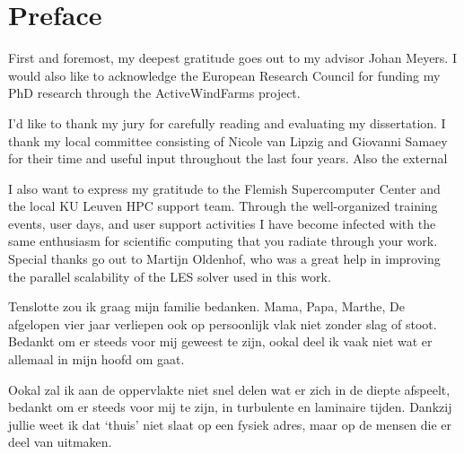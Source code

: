 \chapter*{Preface}                                  \label{ch:preface}

First and foremost, my deepest gratitude goes out to my advisor Johan Meyers. %
I would also like to acknowledge the European Research Council for funding my PhD research through the ActiveWindFarms project. 

I'd like to thank my jury for carefully reading and evaluating my dissertation. I thank my local committee consisting of Nicole van Lipzig and Giovanni Samaey for their time and useful input throughout the last four years. Also the external 









I also want to express my gratitude to the Flemish Supercomputer Center and the local KU Leuven HPC support team. Through the well-organized training events, user days, and user support activities I have become infected with the same enthusiasm for scientific computing that you radiate through your work. Special thanks go out to Martijn Oldenhof, who was a great help in improving the parallel scalability of the LES solver used in this work.





Tenslotte zou ik graag mijn familie bedanken. Mama,
Papa,
Marthe,
De afgelopen vier jaar verliepen ook op persoonlijk vlak niet zonder slag of stoot. Bedankt om er steeds voor mij geweest te zijn, ookal deel ik vaak niet wat er allemaal in mijn hoofd om gaat. 

Ookal zal ik aan de oppervlakte niet snel delen wat er zich in de diepte afspeelt, bedankt om er steeds voor mij te zijn, in turbulente en laminaire tijden. Dankzij jullie weet ik dat `thuis' niet slaat op een fysiek adres, maar op de mensen die er deel van uitmaken. 

\cleardoublepage

